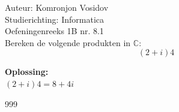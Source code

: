 \documentclass[a4paper]{article}
\begin{document}
	
	\noindent \large Auteur: Komronjon Vosidov \\
	\noindent \large Studierichting: Informatica\\
	\noindent \large Oefeningenreeks 1B nr. 8.1\\
	
	
	
	\normalsize
	Bereken de volgende produkten in $\mathbb{C}$:
	\begin{equation*}
		(2+i)4
	\end{equation*}
	
	
\textbf{Oplossing:}\\
	
	$(2+i)4=8+4i$ \\	

	
	\begin{thebibliography}{999}
		
	\end{thebibliography}	
	
	
\end{document}
